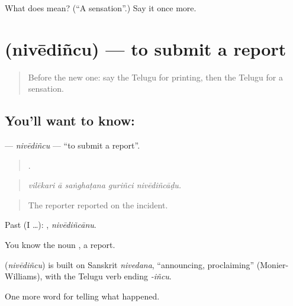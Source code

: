 \begin{tcolorbox}[breakable,colback=teal!4,colframe=teal!35!black,title={Before you move on}]
What does  mean? (\textquotedblleft{}A sensation\textquotedblright{}.) Say it once more.
\end{tcolorbox}
\section[\texorpdfstring{\te{నివేదించు} (nivēdiñcu)}{నివేదించు (nivēdiñcu)}]{ (nivēdiñcu) — to submit a report}

\label{lesson:TE-C375-nivedincu}



\begin{quote}
Before the new one: say the Telugu for printing, then the Telugu for a sensation.
\end{quote}

\subsection*{You'll want to know: }
\textbf{} — \emph{nivēdiñcu} — \textquotedblleft{}to submit a report\textquotedblright{}.

\begin{quote}
    .
\end{quote}

\begin{quote}
\emph{vilēkari ā saṅghaṭana guriñci nivēdiñcāḍu.}
\end{quote}

\begin{quote}
The reporter reported on the incident.
\end{quote}

Past (I …): , \emph{nivēdiñcānu}.

You know the noun , a report.

\begin{cousinweb}
\textbf{} (\emph{nivēdiñcu}) is built on Sanskrit \emph{nivedana}, \textquotedblleft{}announcing, proclaiming\textquotedblright{} (Monier-Williams), with the Telugu verb ending \emph{-iñcu}.
\end{cousinweb}

\begin{grammarlens}[title={What you've built}]
One more word for telling what happened.
\end{grammarlens}

